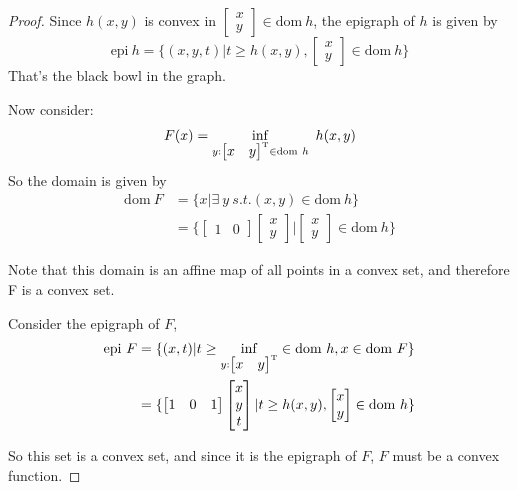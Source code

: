 \begin{proof}
	Since $h(x,y)$ is convex in 
	$\begin{bmatrix}
	x\\
	y
	\end{bmatrix}
	\in \text{dom}\ h$, the epigraph of $h$ is given by 
	\begin{equation*}
	\text{epi}\ h = \{(x,y,t)|t\geq h(x,y), \begin{bmatrix}
	x\\
	y
	\end{bmatrix}\in \text{dom}\ h \}
	\end{equation*}
	That's the black bowl in the graph. 
	
	Now consider:
	\begin{equation*}
	F(x) = \inf_{y:
		\begin{bmatrix}
		x&y
		\end{bmatrix}^{{\rm T}}
		\in \text{dom}\ h}
	\ h(x,y)
	\end{equation*}
	So the domain is given by
	\begin{align*}
	\text{dom}\ F &= \{x|\exists\ y\ s.t. (x,y)\in \text{dom}\ h \}\\
	&= \{\begin{bmatrix}
	1&0
	\end{bmatrix}
	\begin{bmatrix}
	x\\
	y
	\end{bmatrix} 
	|
	\begin{bmatrix}
	x\\
	y
	\end{bmatrix}\in \text{dom}\ h \}
	\end{align*}
	
	Note that this domain is an affine map of all points in a convex set, and therefore  F is a convex set.
	
	Consider the epigraph of $F$,
\begin{align*}
\text{epi}\ F 
&= \{(x,t)|t\geq \inf_{y:
	\begin{bmatrix}
	x&y
	\end{bmatrix}^{{\rm T}}
}
\in \text{dom}\ h, x\in \text{dom}\ F \}\\
&= \{
\begin{bmatrix}
1&0&1
\end{bmatrix}
\begin{bmatrix}
x\\
y\\
t
\end{bmatrix}
\vert t\geq h(x,y), 
\begin{bmatrix}
x\\
y
\end{bmatrix}\in \text{dom}\ h \}
\end{align*}

So this set is a convex set, and since it is the epigraph of $F$, $F$ must be a convex function. 

\end{proof}


